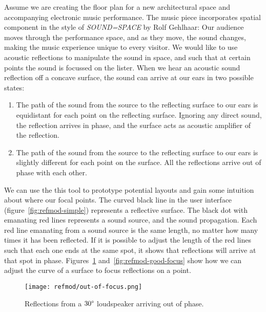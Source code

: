 Assume we are creating the floor plan for a new architectural space
and accompanying electronic music performance. The music piece
incorporates spatial component in the style of \textit{SOUND=SPACE} by
Rolf Gehlhaar: Our audience moves through the performance space, and
as they move, the sound changes, making the music experience unique to
every visitor. We would like to use acoustic reflections to manipulate
the sound in space, and such that at certain points the sound is
focussed on the lister. When we hear an acoustic sound reflection off
a concave surface, the sound can arrive at our ears in two possible
states:
\begin{enumerate}
\item The path of the sound from the source to the reflecting surface
  to our ears is equidistant for each point on the reflecting
  surface. Ignoring any direct sound, the reflection arrives in phase,
  and the surface acts as acoustic amplifier of the reflection.
\item The path of the sound from the source to the reflecting surface
  to our ears is slightly different for each point on the surface. All
  the reflections arrive out of phase with each other.
\end{enumerate}
We can use the this tool to prototype potential layouts and gain some
intuition about where our focal points. The curved black line in the
user interface (figure~\ref{fig:refmod-simple}) represents a
reflective surface. The black dot with emanating red lines represents
a sound source, and the sound propagation.  Each red line emanating
from a sound source is the same length, no matter how many times it
has been reflected. If it is possible to adjust the length of the red
lines such that each one ends at the same spot, it shows that
reflections will arrive at that spot in
phase. Figures~\ref{fig:refmod-bad-focus}
and~\ref{fig:refmod-good-focus} show how we can adjust the curve of a
surface to focus reflections on a point.

\begin{figure}[]
  \texttt{[image: refmod/out-of-focus.png]}
  \caption[]{Reflections from a $30\degree$ loudspeaker arriving out of phase.}
  \label{fig:refmod-bad-focus}
\end{figure}

